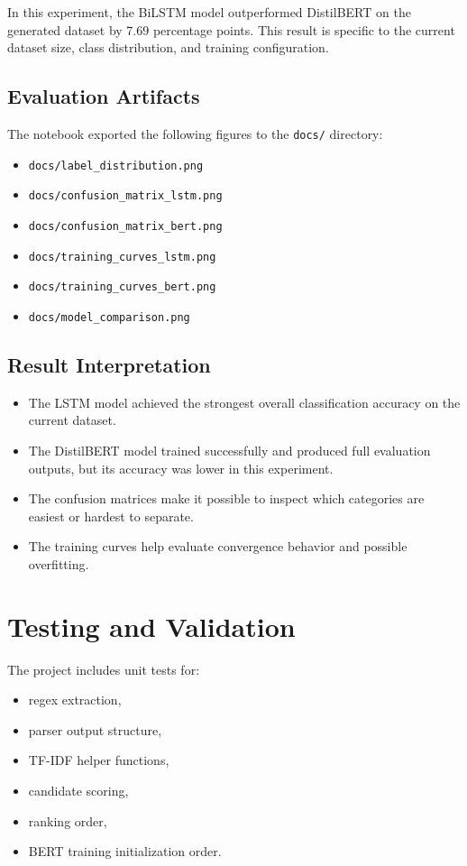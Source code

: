 \documentclass[12pt,a4paper]{article}
\begin{document}
In this experiment, the BiLSTM model outperformed DistilBERT on the generated dataset by 7.69 percentage points. This result is specific to the current dataset size, class distribution, and training configuration.

\subsection{Evaluation Artifacts}
The notebook exported the following figures to the \texttt{docs/} directory:
\begin{itemize}[leftmargin=1.5em]
    \item \texttt{docs/label\_distribution.png}
    \item \texttt{docs/confusion\_matrix\_lstm.png}
    \item \texttt{docs/confusion\_matrix\_bert.png}
    \item \texttt{docs/training\_curves\_lstm.png}
    \item \texttt{docs/training\_curves\_bert.png}
    \item \texttt{docs/model\_comparison.png}
\end{itemize}

\subsection{Result Interpretation}
\begin{itemize}[leftmargin=1.5em]
    \item The LSTM model achieved the strongest overall classification accuracy on the current dataset.
    \item The DistilBERT model trained successfully and produced full evaluation outputs, but its accuracy was lower in this experiment.
    \item The confusion matrices make it possible to inspect which categories are easiest or hardest to separate.
    \item The training curves help evaluate convergence behavior and possible overfitting.
\end{itemize}

\section{Testing and Validation}
The project includes unit tests for:
\begin{itemize}[leftmargin=1.5em]
    \item regex extraction,
    \item parser output structure,
    \item TF-IDF helper functions,
    \item candidate scoring,
    \item ranking order,
    \item BERT training initialization order.
\end{itemize}
\end{document}
